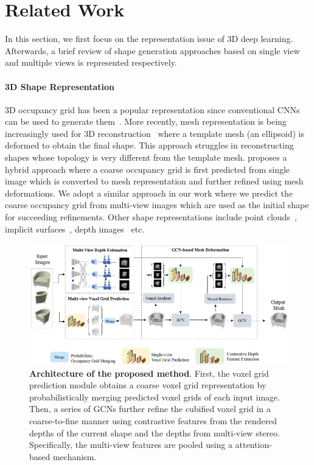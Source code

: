 \section{Related Work}
In this section, we first focus on the representation issue of 3D deep learning. Afterwards, a brief review of shape generation approaches based on single view and multiple views is represented respectively.  

\paragraph{3D Shape Representation}\vspace{-4mm}
3D occupancy grid has been a popular representation since conventional CNNs can be used to generate them~\cite{3dr2n2,kar2017lsm}.
More recently, mesh representation is being increasingly used for 3D reconstruction~\cite{wang2018pixel2mesh,wen2019pixel2mesh++} where a template mesh (an ellipsoid) is deformed to obtain the final shape.
This approach struggles in reconstructing shapes whose topology is very different from the template mesh.
\cite{gkioxari2019meshrcnn} proposes a hybrid approach where a coarse occupancy grid is first predicted from single image which is converted to mesh representation and further refined using mesh deformations.
We adopt a similar approach in our work where we predict the coarse occupancy grid from multi-view images which are used as the initial shape for succeeding refinements.
Other shape representations include point clouds~\cite{fan2017point,yang2018foldingnet,jia2020dv}, implicit surfaces~\cite{park2019deepsdf}, depth images~\cite{yao2018mvsnet,yao2019recurrent} etc.

\begin{figure}[t]
\begin{center}
\includegraphics[width=0.95\linewidth]{imgs/arc.png}
\end{center}
\caption{
    \textbf{Architecture of the proposed method}.
    First, the voxel grid prediction module obtains a coarse voxel grid representation by probabilistically merging predicted voxel grids of each input image.
    Then, a series of GCNs further refine the cubified voxel grid in a coarse-to-fine manner using contrastive features from the rendered depths of the current shape and the depths from multi-view stereo.
    Specifically, the multi-view features are pooled using a attention-based mechanism.
}
\label{fig:system_architecture}
\end{figure}

